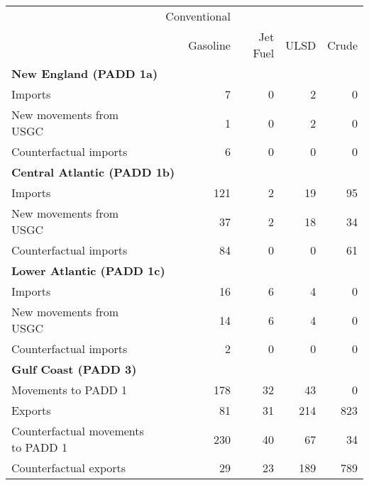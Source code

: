 \begin{tabular}{lrrrr}
   \midrule & Conventional & &  & \\

                            & Gasoline & Jet Fuel & ULSD & Crude \\ 
                            \midrule \multicolumn{5}{l}{\textbf{New England (PADD 1a)}} \\
Imports & 7 & 0 & 2 & 0 \\ 
  New movements from USGC & 1 & 0 & 2 & 0 \\ 
  Counterfactual imports & 6 & 0 & 0 & 0 \\ 
   \midrule \multicolumn{5}{l}{\textbf{Central Atlantic (PADD 1b)}} \\
Imports & 121 & 2 & 19 & 95 \\ 
  New movements from USGC & 37 & 2 & 18 & 34 \\ 
  Counterfactual imports & 84 & 0 & 0 & 61 \\ 
   \midrule \multicolumn{5}{l}{\textbf{Lower Atlantic (PADD 1c)}} \\
Imports & 16 & 6 & 4 & 0 \\ 
  New movements from USGC & 14 & 6 & 4 & 0 \\ 
  Counterfactual imports & 2 & 0 & 0 & 0 \\ 
   \midrule \multicolumn{5}{l}{\textbf{Gulf Coast (PADD 3)}} \\
Movements to PADD 1 & 178 & 32 & 43 & 0 \\ 
  Exports & 81 & 31 & 214 & 823 \\ 
  Counterfactual movements to PADD 1 & 230 & 40 & 67 & 34 \\ 
  Counterfactual exports & 29 & 23 & 189 & 789 \\ 
   \hline
\end{tabular}
